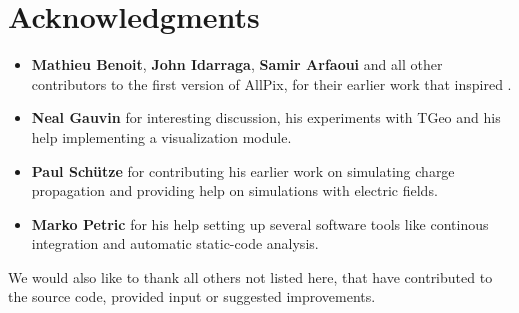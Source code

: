 \section{Acknowledgments}
\begin{itemize}
\item \textbf{Mathieu Benoit}, \textbf{John Idarraga}, \textbf{Samir Arfaoui} and all other contributors to the first version of AllPix, for their earlier work that inspired \apsq.
\item \textbf{Neal Gauvin} for interesting discussion, his experiments with TGeo and his help implementing a visualization module.
\item \textbf{Paul Sch\"utze} for contributing his earlier work on simulating charge propagation and providing help on simulations with electric fields.
\item \textbf{Marko Petric} for his help setting up several software tools like continous integration and automatic static-code analysis.
\end{itemize}
We would also like to thank all others not listed here, that have contributed to the source code, provided input or suggested improvements. 
